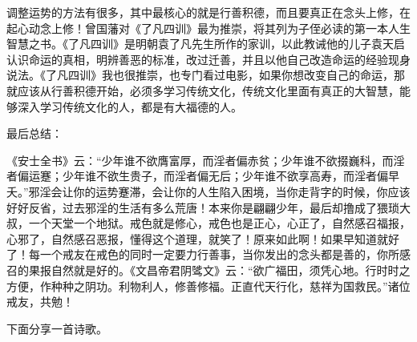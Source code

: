 调整运势的方法有很多，其中最核心的就是行善积德，而且要真正在念头上修，在起心动念上修！曾国藩对《了凡四训》最为推崇，将其列为子侄必读的第一本人生智慧之书。《了凡四训》是明朝袁了凡先生所作的家训，以此教诫他的儿子袁天启认识命运的真相，明辨善恶的标准，改过迁善，并且以他自己改造命运的经验现身说法。《了凡四训》我也很推崇，也专门看过电影，如果你想改变自己的命运，那就应该从行善积德开始，必须多学习传统文化，传统文化里面有真正的大智慧，能够深入学习传统文化的人，都是有大福德的人。

最后总结：

《安士全书》云：“少年谁不欲膺富厚，而淫者偏赤贫；少年谁不欲掇巍科，而淫者偏运蹇；少年谁不欲生贵子，而淫者偏无后；少年谁不欲享高寿，而淫者偏早夭。”邪淫会让你的运势蹇滞，会让你的人生陷入困境，当你走背字的时候，你应该好好反省，过去邪淫的生活有多么荒唐！本来你是翩翩少年，最后却撸成了猥琐大叔，一个天堂一个地狱。戒色就是修心，戒色也是正心，心正了，自然感召福报，心邪了，自然感召恶报，懂得这个道理，就笑了！原来如此啊！如果早知道就好了！每一个戒友在戒色的同时一定要力行善事，当你发出的念头都是善的，你所感召的果报自然就是好的。《文昌帝君阴骘文》云：“欲广福田，须凭心地。行时时之方便，作种种之阴功。利物利人，修善修福。正直代天行化，慈祥为国救民。”诸位戒友，共勉！

下面分享一首诗歌。


